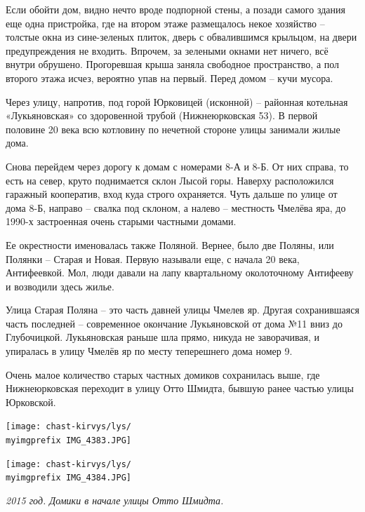 Если обойти дом, видно нечто вроде подпорной стены, а позади самого здания еще одна пристройка, где на втором этаже размещалось некое хозяйство – толстые окна из сине-зеленых плиток, дверь с обвалившимся крыльцом, на двери предупреждения не входить. Впрочем, за зелеными окнами нет ничего, всё внутри обрушено. Прогоревшая крыша заняла свободное пространство, а пол второго этажа исчез, вероятно упав на первый. Перед домом – кучи мусора.

Через улицу, напротив, под горой Юрковицей (исконной) – районная котельная «Лукьяновская» со здоровенной трубой (Нижнеюрковская 53). В первой половине 20 века всю котловину по нечетной стороне улицы занимали жилые дома.

Снова перейдем через дорогу к домам с номерами 8-А и 8-Б. От них справа, то есть на север, круто поднимается склон Лысой горы. Наверху расположился гаражный кооператив, вход куда строго охраняется. Чуть дальше по улице от дома 8-Б, направо – свалка под склоном, а налево – местность Чмелёва яра, до 1990-х застроенная очень старыми частными домами. 

Ее окрестности именовалась также Поляной. Вернее, было две Поляны, или Полянки – Старая и Новая. Первую называли еще, с начала 20 века, Антифеевкой. Мол, люди давали на лапу квартальному околоточному Антифееву и возводили здесь жилье.

Улица Старая Поляна – это часть давней улицы Чмелев яр. Другая сохранившаяся часть последней – современное окончание Лукьяновской от дома №11 вниз до Глубочицкой. Лукьяновская раньше шла прямо, никуда не заворачивая, и упиралась в улицу Чмелёв яр по месту теперешнего дома номер 9.

Очень малое количество старых частных домиков сохранилась выше, где Нижнеюрковская переходит в улицу Отто Шмидта, бывшую ранее частью улицы Юрковской. 

\newpage
\vspace*{\fill}
\begin{center}
\texttt{[image: chast-kirvys/lys/\\myimgprefix IMG\_4383.JPG]}
\end{center} 

\begin{center}
\texttt{[image: chast-kirvys/lys/\\myimgprefix IMG\_4384.JPG]}

\textit{2015 год. Домики в начале улицы Отто Шмидта.}
\end{center} 
\vspace*{\fill}
\newpage

